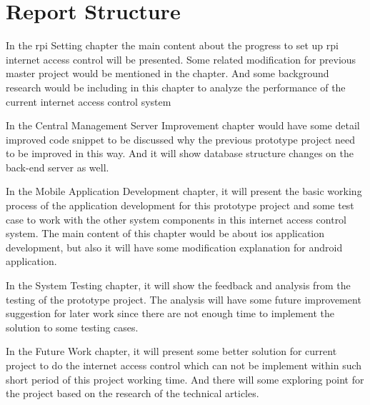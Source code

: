 \section{Report Structure}
\par In the \gls{rpi} Setting chapter the main content about the progress to set up \gls{rpi} internet access control will be presented. Some related modification for previous master project would be mentioned in the chapter. And some background research would be including in this chapter to analyze the performance of the current internet access control system
\par In the Central Management Server Improvement chapter would have some detail improved code snippet to be discussed why the previous prototype project need to be improved in this way. And it will show database structure changes on the back-end server as well.
\par In the Mobile Application Development chapter, it will present the basic working process of the application development for this prototype project and some test case to work with the other system components in this internet access control system. The main content of this chapter would be about \gls{ios} application development, but also it will have some modification explanation for android application.
\par In the System Testing chapter, it will show the feedback and analysis from the testing of the prototype project. The analysis will have some future improvement suggestion for later work since there are not enough time to implement the solution to some testing cases.
\par In the Future Work chapter, it will present some better solution for current project to do the internet access control which can not be implement within such short period of this project working time. And there will some exploring point for the project based on the research of the technical articles.